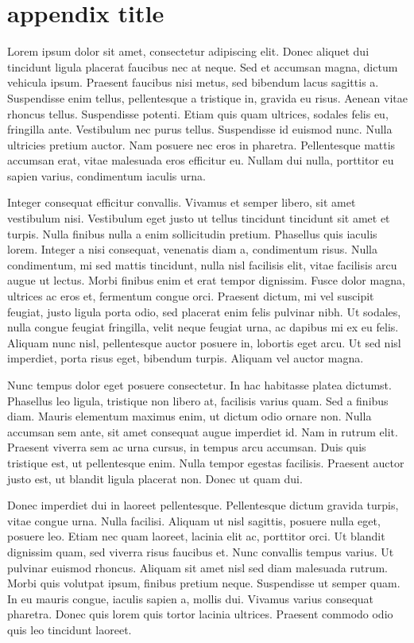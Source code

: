 \chapter{appendix title}

Lorem ipsum dolor sit amet, consectetur adipiscing elit. Donec aliquet dui tincidunt ligula placerat faucibus nec at neque. Sed et accumsan magna, dictum vehicula ipsum. Praesent faucibus nisi metus, sed bibendum lacus sagittis a. Suspendisse enim tellus, pellentesque a tristique in, gravida eu risus. Aenean vitae rhoncus tellus. Suspendisse potenti. Etiam quis quam ultrices, sodales felis eu, fringilla ante. Vestibulum nec purus tellus. Suspendisse id euismod nunc. Nulla ultricies pretium auctor. Nam posuere nec eros in pharetra. Pellentesque mattis accumsan erat, vitae malesuada eros efficitur eu. Nullam dui nulla, porttitor eu sapien varius, condimentum iaculis urna.

Integer consequat efficitur convallis. Vivamus et semper libero, sit amet vestibulum nisi. Vestibulum eget justo ut tellus tincidunt tincidunt sit amet et turpis. Nulla finibus nulla a enim sollicitudin pretium. Phasellus quis iaculis lorem. Integer a nisi consequat, venenatis diam a, condimentum risus. Nulla condimentum, mi sed mattis tincidunt, nulla nisl facilisis elit, vitae facilisis arcu augue ut lectus. Morbi finibus enim et erat tempor dignissim. Fusce dolor magna, ultrices ac eros et, fermentum congue orci. Praesent dictum, mi vel suscipit feugiat, justo ligula porta odio, sed placerat enim felis pulvinar nibh. Ut sodales, nulla congue feugiat fringilla, velit neque feugiat urna, ac dapibus mi ex eu felis. Aliquam nunc nisl, pellentesque auctor posuere in, lobortis eget arcu. Ut sed nisl imperdiet, porta risus eget, bibendum turpis. Aliquam vel auctor magna.

Nunc tempus dolor eget posuere consectetur. In hac habitasse platea dictumst. Phasellus leo ligula, tristique non libero at, facilisis varius quam. Sed a finibus diam. Mauris elementum maximus enim, ut dictum odio ornare non. Nulla accumsan sem ante, sit amet consequat augue imperdiet id. Nam in rutrum elit. Praesent viverra sem ac urna cursus, in tempus arcu accumsan. Duis quis tristique est, ut pellentesque enim. Nulla tempor egestas facilisis. Praesent auctor justo est, ut blandit ligula placerat non. Donec ut quam dui.

Donec imperdiet dui in laoreet pellentesque. Pellentesque dictum gravida turpis, vitae congue urna. Nulla facilisi. Aliquam ut nisl sagittis, posuere nulla eget, posuere leo. Etiam nec quam laoreet, lacinia elit ac, porttitor orci. Ut blandit dignissim quam, sed viverra risus faucibus et. Nunc convallis tempus varius. Ut pulvinar euismod rhoncus. Aliquam sit amet nisl sed diam malesuada rutrum. Morbi quis volutpat ipsum, finibus pretium neque. Suspendisse ut semper quam. In eu mauris congue, iaculis sapien a, mollis dui. Vivamus varius consequat pharetra. Donec quis lorem quis tortor lacinia ultrices. Praesent commodo odio quis leo tincidunt laoreet.

